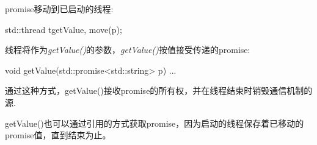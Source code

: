promise移动到已启动的线程:

\begin{cppcode}
std::thread t{getValue, move(p)};
\end{cppcode}

线程将作为\textit{getValue()}的参数，\textit{getValue()}按值接受传递的promise:

\begin{cppcode}
void getValue(std::promise<std::string> p)
{
	...
}
\end{cppcode}

通过这种方式，getValue()接收promise的所有权，并在线程结束时销毁通信机制的源.

getValue()也可以通过引用的方式获取promise，因为启动的线程保存着已移动的promise值，直到结束为止。














